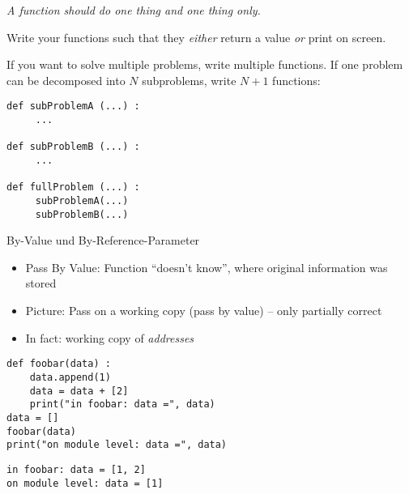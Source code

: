 
\begin{frame}[fragile]
%
\begin{hintbox}
\emph{A function should do one thing and one thing only.}

\vspace{6pt}
Write your functions such that they \emph{either} return a value \emph{or} print on screen.

\vspace{6pt}
If you want to solve multiple problems, write multiple functions. If one problem can be decomposed into $N$ subproblems, write $N+1$ functions:

\begin{codebox}
\begin{verbatim}
def subProblemA (...) :
     ...
   
def subProblemB (...) :
     ...
   
def fullProblem (...) :
     subProblemA(...)
     subProblemB(...) 
\end{verbatim}
\end{codebox}
\end{hintbox}
%
\end{frame}


\begin{frame}[fragile]{By-Value und By-Reference-Parameter}
%
\begin{itemize}
\item Pass By Value: Function \enquote{doesn't know}, where original information was stored
\item Picture: Pass on a working copy (pass by value) -- only partially correct
\item In fact: working copy of \emph{addresses}
\end{itemize}
%
\begin{tcbraster}[raster columns=2,
                  raster equal height,
                  nobeforeafter,
                  raster column skip=0.5cm]
\begin{codebox}
\begin{verbatim}
def foobar(data) :
    data.append(1)
    data = data + [2]
    print("in foobar: data =", data)
data = []
foobar(data)
print("on module level: data =", data)
\end{verbatim}
\end{codebox}
%
\begin{cmdbox}
\begin{verbatim}
in foobar: data = [1, 2]
on module level: data = [1]
\end{verbatim}
\end{cmdbox}
\end{tcbraster}
%
\end{frame}

